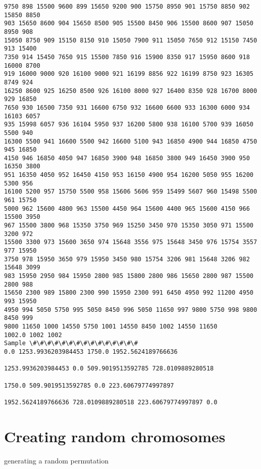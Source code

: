 \documentclass[11pt]{article}
\begin{document}
\begin{Verbatim}[commandchars=\\\{\}]
9750 898 15500 9600 899 15650 9200 900 15750 8950 901 15750 8850 902 15850 8850
903 15650 8600 904 15650 8500 905 15500 8450 906 15500 8600 907 15050 8950 908
15050 8750 909 15150 8150 910 15050 7900 911 15050 7650 912 15150 7450 913 15400
7350 914 15450 7650 915 15500 7850 916 15900 8350 917 15950 8600 918 16000 8700
919 16000 9000 920 16100 9000 921 16199 8856 922 16199 8750 923 16305 8749 924
16250 8600 925 16250 8500 926 16100 8000 927 16400 8350 928 16700 8000 929 16850
7650 930 16500 7350 931 16600 6750 932 16600 6600 933 16300 6000 934 16103 6057
935 15998 6057 936 16104 5950 937 16200 5800 938 16100 5700 939 16050 5500 940
16300 5500 941 16600 5500 942 16600 5100 943 16850 4900 944 16850 4750 945 16850
4150 946 16850 4050 947 16850 3900 948 16850 3800 949 16450 3900 950 16350 3800
951 16350 4050 952 16450 4150 953 16150 4900 954 16200 5050 955 16200 5300 956
16100 5200 957 15750 5500 958 15606 5606 959 15499 5607 960 15498 5500 961 15750
5000 962 15600 4800 963 15500 4450 964 15600 4400 965 15600 4150 966 15500 3950
967 15500 3800 968 15350 3750 969 15250 3450 970 15350 3050 971 15500 3200 972
15500 3300 973 15600 3650 974 15648 3556 975 15648 3450 976 15754 3557 977 15950
3750 978 15950 3650 979 15950 3450 980 15754 3206 981 15648 3206 982 15648 3099
983 15950 2950 984 15950 2800 985 15800 2800 986 15650 2800 987 15500 2800 988
15650 2300 989 15800 2300 990 15950 2300 991 6450 4950 992 11200 4950 993 15950
4950 994 5050 5750 995 5050 8450 996 5050 11650 997 9800 5750 998 9800 8450 999
9800 11650 1000 14550 5750 1001 14550 8450 1002 14550 11650
1002.0 1002 1002
Sample \#\#\#\#\#\#\#\#\#\#\#\#\#\#\#
0.0 1253.9936203984453 1750.0 1952.5624189766636

1253.9936203984453 0.0 509.9019513592785 728.0109889280518

1750.0 509.9019513592785 0.0 223.60679774997897

1952.5624189766636 728.0109889280518 223.60679774997897 0.0

    \end{Verbatim}

    \hypertarget{creating-random-chromosomes}{%
\section{Creating random
chromosomes}\label{creating-random-chromosomes}}

generating a random permutation
\end{document}
